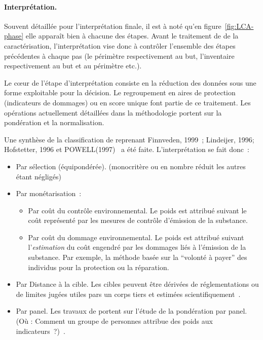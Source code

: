 \paragraph{Interprétation.}
Souvent détaillée pour l'interprétation finale, il est à noté qu'en figure~\ref{fig:LCA-phase} elle apparaît bien à chacune des étapes.
Avant le traitement de de la caractérisation, l'interprétation vise donc à contrôler l'ensemble des étapes précédentes à chaque pas (le périmètre respectivement au but, l'inventaire respectivement au but et au périmètre etc.).

Le cœur de l'étape d'interprétation consiste en la réduction des données sous une forme exploitable pour la décision.
Le regroupement en aires de protection (indicateurs de dommages) ou en score unique font partie de ce traitement.
Les opérations actuellement détaillées dans la méthodologie portent sur la pondération et la normalisation.

Une synthèse de la classification de \citeauthor{rowley_aggregating_2012} reprenant Finnveden, 1999~\cite{finnveden_critical_1999}; Lindeijer, 1996; Hofstetter, 1996 et POWELL(1997)~\cite{powell_approaches_1997} a été faite.
L'interprétation se fait donc~:
\begin{itemize}
\item Par sélection (équipondérée). (monocritère ou en nombre réduit les autres étant négligés)
\item Par monétarisation~:
\begin{itemize}
\item Par coût du contrôle environnemental. 
Le poids est attribué suivant le coût représenté par les mesures de contrôle d'émission de la substance.
\item Par coût du dommage environnemental.
Le poids est attribué suivant l'\emph{estimation} du coût engendré par les dommages liés à l'émission de la substance.
Par exemple, la méthode basée sur la ``volonté à payer'' des individus pour la protection ou la réparation.%
\end{itemize}
\item Par Distance à la cible. Les cibles peuvent être dérivées de réglementations ou de limites jugées utiles pars un corps tiers et estimées scientifiquement~\cite{seppala_meaning_2001}.
\item Par panel. Les travaux de \citeauthor{myllyviita_impact_2014} portent sur l'étude de la pondération par panel. (Où : Comment un groupe de personnes attribue des poids aux indicateurs~?)~\cite{myllyviita_impact_2014}.
\end{itemize}

